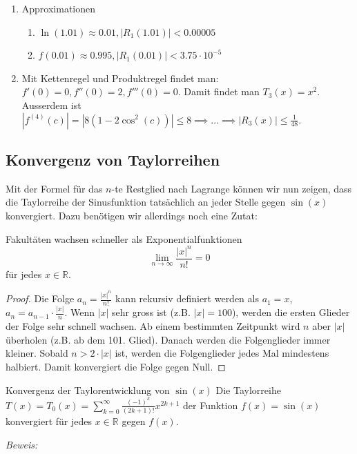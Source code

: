\begin{enumerate}
    \item  Approximationen
    \begin{enumerate}
        \item \( \ln(1.01) \approx 0.01, |R_1(1.01)| < 0.00005 \)
        \item\( f(0.01) \approx 0.995, |R_1(0.01)| < 3.75 \cdot 10^{-5} \)
        
        
    \end{enumerate}
        
       \item Mit Kettenregel und Produktregel findet man: \( f'(0) = 0, f''(0) = 2, f'''(0) = 0 \).
        Damit findet man \( T_3(x) = x^2 \).
        Ausserdem ist \( |f^{(4)}(c)| = |8(1-2 \cos^2(c))| \leq 8 \implies \dots \implies |R_3(x)| \leq \frac{1}{48} \).
        
      
\end{enumerate}
\clearpage

\subsection{Konvergenz von Taylorreihen}

Mit der Formel für das $n$-te Restglied nach Lagrange können wir nun zeigen, dass die Taylorreihe der Sinusfunktion tatsächlich an jeder Stelle gegen $\sin(x)$ konvergiert. Dazu benötigen wir allerdings noch eine Zutat:
\begin{satz}
    {Fakultäten wachsen schneller als Exponentialfunktionen}{}
    \[\lim_{{n \to \infty}} \frac{|x|^n}{n!} = 0\] für jedes \(x \in \mathbb{R}\).

\end{satz}
\begin{proof}
    Die Folge \(a_n = \frac{|x|^n}{n!}\) kann rekursiv definiert werden als \(a_1 = x\), \(a_n = a_{n-1} \cdot \frac{|x|}{n}\). Wenn \(|x|\) sehr gross ist (z.B. \(|x| = 100\)), werden die ersten Glieder der Folge sehr schnell wachsen. Ab einem bestimmten Zeitpunkt wird \(n\) aber \(|x|\) überholen (z.B. ab dem 101. Glied). Danach werden die Folgenglieder immer kleiner. Sobald \(n > 2 \cdot |x|\) ist, werden die Folgenglieder jedes Mal mindestens halbiert. Damit konvergiert die Folge gegen Null.

\end{proof}
\begin{satz}
    {Konvergenz der Taylorentwicklung von $\sin(x)$}{}
    Die Taylorreihe \(T(x) = T_0(x) = \sum_{k=0}^{\infty} \frac{(-1)^k}{(2k+1)!} x^{2k+1}\) der Funktion \(f(x) = \sin(x)\) konvergiert für jedes \(x \in \mathbb{R}\) gegen \(f(x)\).

\end{satz}
\textit{Beweis:}

